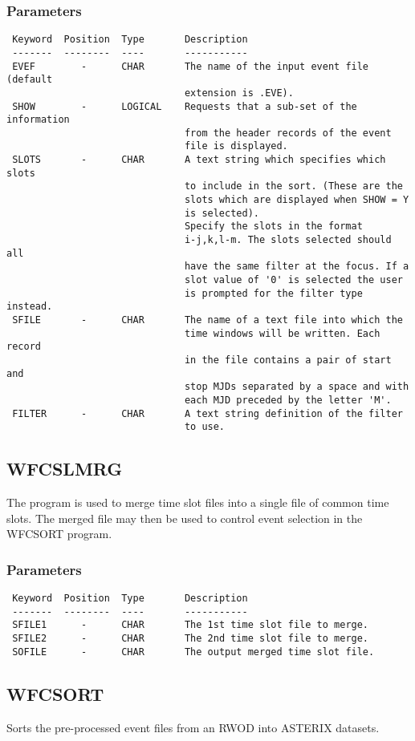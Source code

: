 \documentclass{book}
\renewcommand{\_}{{\tt\char'137}}     %
\begin{document}
\subsubsection{Parameters}
\begin{verbatim}
 Keyword  Position  Type       Description
 -------  --------  ----       -----------
 EVEF        -      CHAR       The name of the input event file (default
                               extension is .EVE).
 SHOW        -      LOGICAL    Requests that a sub-set of the information
                               from the header records of the event
                               file is displayed.
 SLOTS       -      CHAR       A text string which specifies which slots
                               to include in the sort. (These are the
                               slots which are displayed when SHOW = Y
                               is selected).
                               Specify the slots in the format
                               i-j,k,l-m. The slots selected should all
                               have the same filter at the focus. If a
                               slot value of '0' is selected the user
                               is prompted for the filter type instead.
 SFILE       -      CHAR       The name of a text file into which the
                               time windows will be written. Each record
                               in the file contains a pair of start and
                               stop MJDs separated by a space and with
                               each MJD preceded by the letter 'M'.
 FILTER      -      CHAR       A text string definition of the filter
                               to use.

\end{verbatim}\subsection{WFCSLMRG}
The program is used to merge time slot files into a single file of common
time slots. The merged file may then be used to control event selection
in the WFCSORT program.

\subsubsection{Parameters}
\begin{verbatim}
 Keyword  Position  Type       Description
 -------  --------  ----       -----------
 SFILE1      -      CHAR       The 1st time slot file to merge.
 SFILE2      -      CHAR       The 2nd time slot file to merge.
 SOFILE      -      CHAR       The output merged time slot file.

\end{verbatim}\subsection{WFCSORT}
Sorts the pre-processed event files from an RWOD into ASTERIX datasets.
\end{document}

